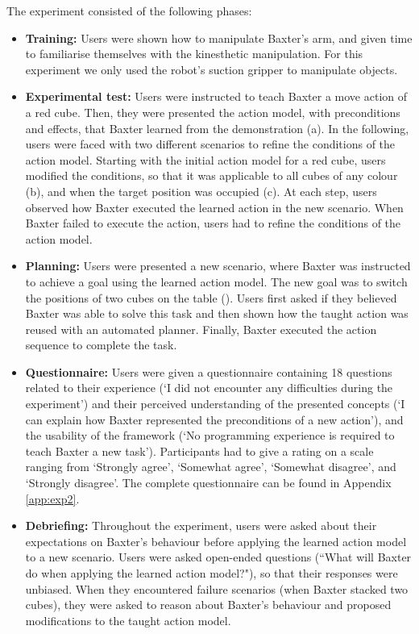 The experiment consisted of the following phases:
\begin{itemize}
  \item{\textbf{Training:} Users were shown how to manipulate Baxter's arm, and given time to familiarise themselves with the kinesthetic manipulation. 
  	For this experiment we only used the robot's suction gripper to manipulate objects.}
  \item{\textbf{Experimental test:} Users were instructed to teach Baxter a move action of a red cube. 
  	Then, they were presented the action model, with preconditions and effects, that Baxter learned from the demonstration (a). 
  	In the following, users were faced with two different scenarios to refine the conditions of the action model. 
  	Starting with the initial action model for a red cube, users modified the conditions, so that it was applicable to all cubes of any colour (b), and when the target position was occupied (c). 
  	At each step, users observed how Baxter executed the learned action in the new scenario. 
  	When Baxter failed to execute the action, users had to refine the conditions of the action model.}
  \item{\textbf{Planning:} Users were presented a new scenario, where Baxter was instructed to achieve a goal using the learned action model. 
  	The new goal was to switch the positions of two cubes on the table (). 
  	Users first asked if they believed Baxter was able to solve this task and then shown how the taught action was reused with an automated planner.
  	Finally, Baxter executed the action sequence to complete the task.}
  \item{\textbf{Questionnaire:} Users were given a questionnaire containing 18 questions related to their experience (\eg `I did not encounter any difficulties during the experiment') and their perceived understanding of the presented concepts (\eg `I can explain how Baxter represented the preconditions of a new action'), and the usability of the framework (\eg `No programming experience is required to teach Baxter a new task').
  Participants had to give a rating on a scale ranging from `Strongly agree', `Somewhat agree', `Somewhat disagree', and `Strongly disagree'.
  The complete questionnaire can be found in Appendix \ref{app:exp2}.}
   \item{ \textbf{Debriefing:} Throughout the experiment, users were asked about their expectations on Baxter's behaviour before applying the learned action model to a new scenario. 
   	Users were asked open-ended questions (\eg ``What will Baxter do when applying the learned action model?"), so that their responses were unbiased. 
   	When they encountered failure scenarios (\eg when Baxter stacked two cubes), they were asked to reason about Baxter's behaviour and proposed modifications to the taught action model.} 
\end{itemize}

